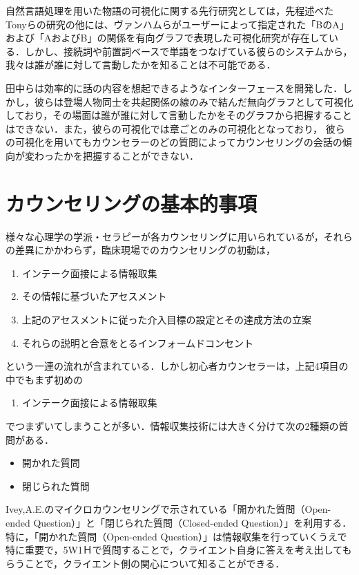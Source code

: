 \documentclass[shuuron]{kuee}
\begin{document}
自然言語処理を用いた物語の可視化に関する先行研究としては，先程述べたTonyら\cite{bergstrom2007seeing}の研究の他には、ヴァンハム\cite{van2009mapping}らがユーザーによって指定された「BのA」および「AおよびB」の関係を有向グラフで表現した可視化研究が存在している．しかし、接続詞や前置詞ベースで単語をつなげている彼らのシステムから，我々は誰が誰に対して言動したかを知ることは不可能である．

田中ら\cite{tanaka}は効率的に話の内容を想起できるようなインターフェースを開発した．しかし，彼らは登場人物同士を共起関係の線のみで結んだ無向グラフとして可視化しており，その場面は誰が誰に対して言動したかをそのグラフから把握することはできない．また，彼らの可視化では章ごとのみの可視化となっており， 彼らの可視化を用いてもカウンセラーのどの質問によってカウンセリングの会話の傾向が変わったかを把握することができない．



\chapter{カウンセリングの基本的事項}

様々な心理学の学派・セラピーが各カウンセリングに用いられているが，それらの差異にかかわらず，臨床現場でのカウンセリングの初動は，

\begin{enumerate}
  \item インテーク面接による情報取集
  \item その情報に基づいたアセスメント
  \item 上記のアセスメントに従った介入目標の設定とその達成方法の立案
  \item それらの説明と合意をとるインフォームドコンセント
\end{enumerate}
という一連の流れが含まれている．しかし初心者カウンセラーは，上記4項目の中でもまず初めの
\begin{enumerate}
  \item インテーク面接による情報取集
\end{enumerate}
でつまずいてしまうことが多い．情報収集技術には大きく分けて次の2種類の質問がある．
\begin{itemize}
  \item 開かれた質問
  \item 閉じられた質問
\end{itemize}

Ivey,A.E.\cite{ivey}のマイクロカウンセリングで示されている「開かれた質問（Open-ended Question）」と「閉じられた質問（Closed-ended Question）」を利用する．特に，「開かれた質問（Open-ended Question）」は情報収集を行っていくうえで特に重要で，5W1Ｈで質問することで，クライエント自身に答えを考え出してもらうことで，クライエント側の関心について知ることができる．
\end{document}
